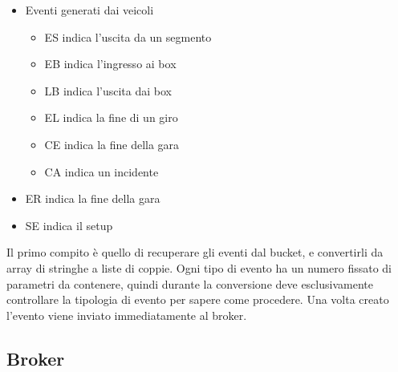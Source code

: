 \begin{itemize}
 \item Eventi generati dai veicoli
 \begin{itemize}
  \item ES indica l’uscita da un segmento
  \item EB indica l’ingresso ai box
  \item LB indica l’uscita dai box
  \item EL indica la fine di un giro
  \item CE indica la fine della gara
  \item CA indica un incidente
 \end{itemize}
 \item ER indica la fine della gara
 \item SE indica il setup
\end{itemize}

Il primo compito è quello di recuperare gli eventi dal bucket, e convertirli da array di stringhe a liste di coppie. Ogni tipo di evento ha un numero fissato di parametri da contenere, quindi durante la conversione deve esclusivamente controllare la tipologia di evento per sapere come procedere.
Una volta creato l’evento viene inviato immediatamente al broker.

\subsection{Broker}

